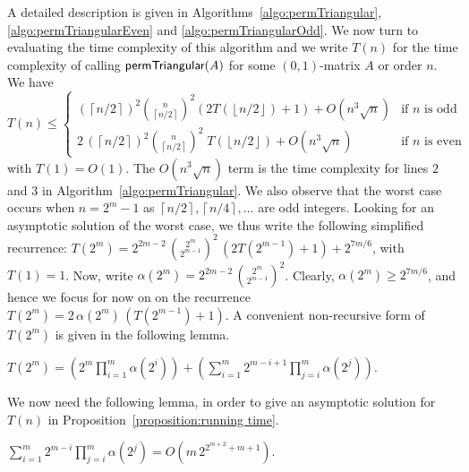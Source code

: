 \documentclass[a4paper,10pt]{llncs}
\begin{document}
A detailed description is given in
Algorithms~\ref{algo:permTriangular},
\ref{algo:permTriangularEven} and
\ref{algo:permTriangularOdd}.
We now turn to evaluating the time complexity of this algorithm
and we write $T(n)$ for the time complexity of calling
$\textbf{\ttfamily\sf permTriangular}(A)$ for some $(0,1)$-matrix $A$ or order $n$.
We have
$$
T(n) \leq
\begin{cases} 
\left(\left\lceil n/2 \right\rceil\right)^2 \binom{n}{\left\lceil n/2 \right\rceil}^2
\left(2T\left(\left\lfloor n/2 \right\rfloor\right)+1\right) 
+ O(n^3\sqrt{n}) & \text{if $n$ is odd} \\
2\,\left(\left\lceil n/2 \right\rceil\right)^2 \binom{n}{\left\lceil n/2 \right\rceil}^2\;
T\left(\left\lfloor n/2 \right\rfloor\right) 
+ O(n^3\sqrt{n}) & \text{if $n$ is even}
\end{cases}
$$
with $T(1) = O(1)$.
The $O(n^3\sqrt{n})$ term
is the time complexity for lines $2$ and $3$ in 
Algorithm~\ref{algo:permTriangular}.
We also observe that the worst case occurs when $n = 2^m - 1$ as 
$\left\lceil n/2 \right\rceil,
\left\lceil n/4 \right\rceil,
\ldots$
are odd integers.
Looking for an asymptotic solution of the worst case, we thus write
the following simplified recurrence:
$
T(2^m)
=
2^{2m - 2} \,
\binom{2^m}{2^{m-1}}^2 \,
\left(2T(2^{m-1}) + 1\right) + 2^{7m/6}
$,
with $T(1) = 1$. 
Now, write $\alpha(2^m) = 2^{2m - 2} \, \binom{2^m}{2^{m-1}}^2$.
Clearly, $\alpha(2^m) \geq 2^{7m/6}$, and hence we focus for now on on
the recurrence
$T(2^m) = 2\,\alpha(2^m)\,\left(T(2^{m-1}) + 1\right)$.
A convenient non-recursive form of $T(2^m)$ is given in the following lemma.

\begin{lemma}
\label{lemma:T}
$
T(2^m)
=
\left(
2^m \prod_{i=1}^{m} \alpha(2^{i})
\right)
+
\left(
\sum_{i=1}^{m}
2^{m-i+1} \prod_{j=i}^{m} \alpha(2^{j})
\right)
$.
\end{lemma}


We now need the following lemma, in order to give an asymptotic
solution for $T(n)$ in Proposition~\ref{proposition:running time}.


\begin{lemma}
\label{lemma:sum prod alpha}
$
\sum_{i=1}^{m}
2^{m-i} \prod_{j=i}^{m} \alpha(2^{j})
=
O\left(m \, 2^{2^{m+2}+m+1}\right)
$.
\end{lemma}
\end{document}
